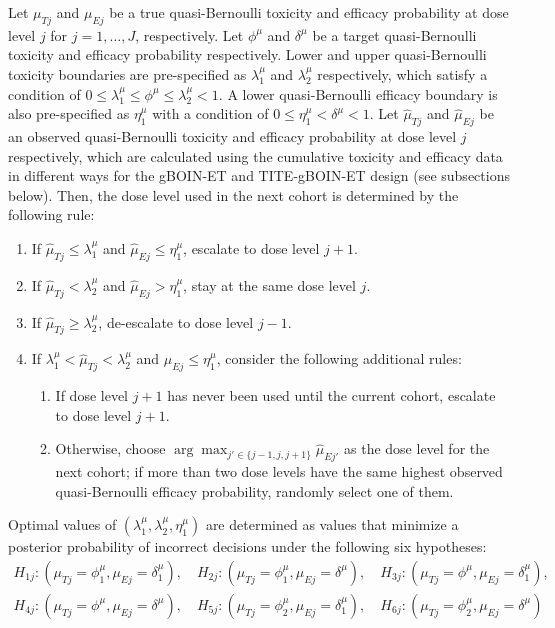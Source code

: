 Let $\mu_{Tj}$ and $\mu_{Ej}$ be a true quasi-Bernoulli toxicity and efficacy probability at dose level $j$ for $ j=1,\ldots,J$, respectively. Let $\phi^{\mu}$ and $\delta^{\mu}$ be a target quasi-Bernoulli toxicity and efficacy probability respectively. Lower and upper quasi-Bernoulli toxicity boundaries are pre-specified as $\lambda^{\mu}_1$ and $\lambda^{\mu}_2$ respectively, which satisfy a condition of $0\leq\lambda^{\mu}_1\leq\phi^{\mu}\leq\lambda^{\mu}_2<1$. A lower quasi-Bernoulli efficacy boundary is also pre-specified as $\eta^{\mu}_1$ with a condition of $0\leq\eta^{\mu}_1<\delta^{\mu}<1$. Let $\hat{\mu}_{Tj}$ and $\hat{\mu}_{Ej}$ be an observed quasi-Bernoulli toxicity and efficacy probability at dose level $j$ respectively, which are calculated using the cumulative toxicity and efficacy data in different ways for the gBOIN-ET and TITE-gBOIN-ET design (see subsections below). Then, the dose level used in the next cohort is determined by the following rule:
\begin{enumerate}
\item If $\hat{\mu}_{Tj}\leq\lambda^{\mu}_1$ and $\hat{\mu}_{Ej}\leq\eta^{\mu}_1$, escalate to dose level $j+1$.
\item If $\hat{\mu}_{Tj}<\lambda^{\mu}_2$ and $\hat{\mu}_{Ej}>\eta^{\mu}_1$, stay at the same dose level $j$.
\item If $\hat{\mu}_{Tj}\geq\lambda^{\mu}_2$, de-escalate to dose level $j-1$.
\item If $\lambda^{\mu}_1<\hat{\mu}_{Tj}<\lambda^{\mu}_2$ and $\hat{\mu}_{Ej}\leq\eta^{\mu}_1$, consider the following additional rules:
  \begin{enumerate}
  \item If dose level $j+1$ has never been used until the current cohort, escalate to dose level $j+1$. 
  \item Otherwise, choose $\arg\max_{j'\in\{j-1,j,j+1\}}\hat{\mu}_{Ej'}$ as the dose level for the next cohort; if more than two dose levels have the same highest observed quasi-Bernoulli efficacy probability, randomly select one of them. 
  \end{enumerate}
\end{enumerate}
Optimal values of $(\lambda^{\mu}_1,\lambda^{\mu}_2,\eta^{\mu}_1)$ are determined as values that minimize a posterior probability of incorrect decisions under the following six hypotheses:
\begin{gather*}
H_{1j}: (\mu_{Tj}=\phi^{\mu}_1,\mu_{Ej}=\delta^{\mu}_1),\quad H_{2j}: (\mu_{Tj}=\phi^{\mu}_1,\mu_{Ej}=\delta^{\mu}),\quad H_{3j}: (\mu_{Tj}=\phi^{\mu},\mu_{Ej}=\delta^{\mu}_1), \\
H_{4j}: (\mu_{Tj}=\phi^{\mu},\mu_{Ej}=\delta^{\mu}),\quad H_{5j}: (\mu_{Tj}=\phi^{\mu}_2,\mu_{Ej}=\delta^{\mu}_1),\quad H_{6j}: (\mu_{Tj}=\phi^{\mu}_2,\mu_{Ej}=\delta^{\mu})
\end{gather*}
